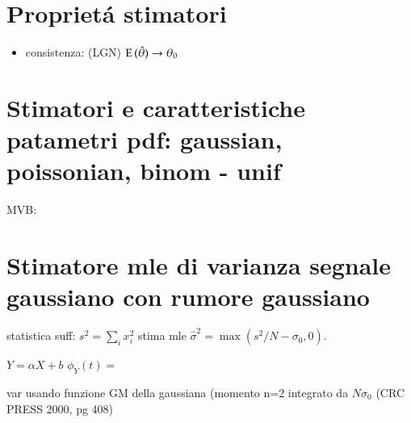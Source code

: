 \section{Propriet\'a stimatori}

\begin{itemize}
\item consistenza: (LGN) $\operatorname{E}{(\hat{\theta})}\to\theta_0$
\end{itemize}

\section{Stimatori e caratteristiche patametri pdf: gaussian, poissonian, binom - unif}

MVB:

\section{Stimatore mle di varianza segnale gaussiano con rumore gaussiano}

statistica suff: $s^2=\sum_ix_i^2$
stima mle $\hat{\sigma}^2=\max{(s^2/N-\sigma_0,0)}$.

$Y=\alpha X+b$ $\phi_Y(t)=$

var usando funzione GM della gaussiana
(momento n=2 integrato da $N\sigma_0$
(CRC PRESS 2000, pg 408)
